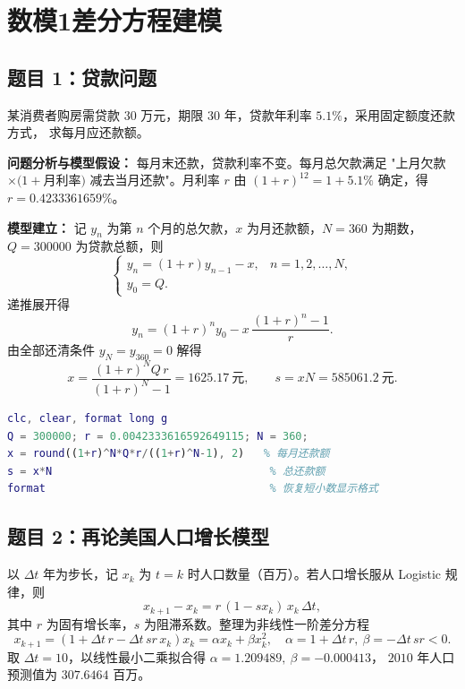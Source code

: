 \documentclass[zihao=5,a4paper]{ctexart}
\begin{document}
\newpage

\thispagestyle{empty}
\tableofcontents
\newpage


\section{数模1差分方程建模}

\subsection{题目 1：贷款问题}
某消费者购房需贷款 $30$ 万元，期限 $30$ 年，贷款年利率 $5.1\%$，采用固定额度还款方式，
求每月应还款额。

\textbf{问题分析与模型假设：} 每月末还款，贷款利率不变。每月总欠款满足
"上月欠款 $\times(1+$月利率$)$ 减去当月还款"。月利率 $r$ 由
$(1+r)^{12}=1+5.1\%$ 确定，得 $r=0.4233361659\%$。

\textbf{模型建立：} 记 $y_n$ 为第 $n$ 个月的总欠款，$x$ 为月还款额，$N=360$ 为期数，
$Q=300000$ 为贷款总额，则
\[
\begin{cases}
y_n=(1+r)y_{n-1}-x, & n=1,2,\dots,N,\\
y_0=Q.
\end{cases}
\]
递推展开得
\[
y_n=(1+r)^n y_0-x\,\frac{(1+r)^n-1}{r}.
\]
由全部还清条件 $y_N=y_{360}=0$ 解得
\[
x=\frac{(1+r)^N Q\,r}{(1+r)^N-1}=1625.17\ \text{元},\qquad
s=xN=585061.2\ \text{元}.
\]

\begin{lstlisting}[language=Matlab]
clc, clear, format long g
Q = 300000; r = 0.0042333616592649115; N = 360;
x = round((1+r)^N*Q*r/((1+r)^N-1), 2)   % 每月还款额
s = x*N                                  % 总还款额
format                                   % 恢复短小数显示格式
\end{lstlisting}

\subsection{题目 2：再论美国人口增长模型}
以 $\Delta t$ 年为步长，记 $x_k$ 为 $t=k$ 时人口数量（百万）。若人口增长服从
Logistic 规律，则
\[
x_{k+1}-x_k=r\,(1-s x_k)\,x_k\,\Delta t,
\]
其中 $r$ 为固有增长率，$s$ 为阻滞系数。整理为非线性一阶差分方程
\[
x_{k+1}=(1+\Delta t\,r-\Delta t\,s r\,x_k)x_k=\alpha x_k+\beta x_k^2,
\quad \alpha=1+\Delta t\,r,\ \beta=-\Delta t\,s r<0.
\]
取 $\Delta t=10$，以线性最小二乘拟合得 $\alpha=1.209489,\ \beta=-0.000413$，
$2010$ 年人口预测值为 $307.6464$ 百万。
\end{document}
